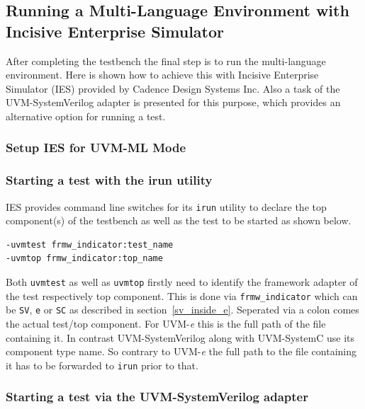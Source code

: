 \subsection{Running a Multi-Language Environment with Incisive Enterprise Simulator}

After completing the testbench the final step is to run the multi-language environment. Here is shown how to achieve
this with Incisive Enterprise Simulator (IES) provided by Cadence Design Systems Inc. Also a task of the
UVM-SystemVerilog adapter is presented for this purpose, which provides an alternative option for running a test.

\subsubsection{Setup IES for UVM-ML Mode}
\subsubsection{Starting a test with the irun utility} \label{uvm_top}

IES provides command line switches for its \lstinline$irun$ utility to declare the top component(s) of the testbench as
well as the test to be started as shown below.
\medskip
{}
\begin{lstlisting}
-uvmtest frmw_indicator:test_name
-uvmtop frmw_indicator:top_name
\end{lstlisting} 
\medskip
Both \lstinline$uvmtest$ as well as \lstinline$uvmtop$ firstly need to identify the framework adapter of the test
respectively top component. This is done via \lstinline$frmw_indicator$ which can be \lstinline$SV$, \lstinline$e$ or
\lstinline$SC$ as described in section~\ref{sv_inside_e}. Seperated via a colon comes the actual test/top component. For
UVM-\textit{e} this is the full path of the file containing it. In contrast UVM-SystemVerilog along with UVM-SystemC use
its component type name. So contrary to UVM-\textit{e} the full path to the file containing it has to be forwarded to
\lstinline$irun$ prior to that.

\subsubsection{Starting a test via the UVM-SystemVerilog adapter}

